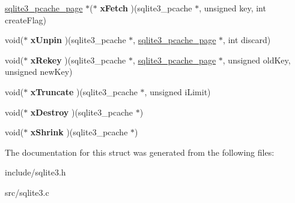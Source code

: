 \begin{DoxyCompactItemize}
\item 
\hypertarget{structsqlite3__pcache__methods2_ac74dd2b35193a4309494311995da2d25}{\hyperlink{structsqlite3__pcache__page}{sqlite3\-\_\-pcache\-\_\-page} $\ast$($\ast$ {\bfseries x\-Fetch} )(sqlite3\-\_\-pcache $\ast$, unsigned key, int create\-Flag)}\label{structsqlite3__pcache__methods2_ac74dd2b35193a4309494311995da2d25}

\item 
\hypertarget{structsqlite3__pcache__methods2_ac94294551eda282f17b1ed2a110e1850}{void($\ast$ {\bfseries x\-Unpin} )(sqlite3\-\_\-pcache $\ast$, \hyperlink{structsqlite3__pcache__page}{sqlite3\-\_\-pcache\-\_\-page} $\ast$, int discard)}\label{structsqlite3__pcache__methods2_ac94294551eda282f17b1ed2a110e1850}

\item 
\hypertarget{structsqlite3__pcache__methods2_a28a22927b108182e22025bbe6ba1f68e}{void($\ast$ {\bfseries x\-Rekey} )(sqlite3\-\_\-pcache $\ast$, \hyperlink{structsqlite3__pcache__page}{sqlite3\-\_\-pcache\-\_\-page} $\ast$, unsigned old\-Key, unsigned new\-Key)}\label{structsqlite3__pcache__methods2_a28a22927b108182e22025bbe6ba1f68e}

\item 
\hypertarget{structsqlite3__pcache__methods2_a7c565709ab91dbe7feb5b82c684ba604}{void($\ast$ {\bfseries x\-Truncate} )(sqlite3\-\_\-pcache $\ast$, unsigned i\-Limit)}\label{structsqlite3__pcache__methods2_a7c565709ab91dbe7feb5b82c684ba604}

\item 
\hypertarget{structsqlite3__pcache__methods2_a144d6e899889e80e00f93fb6c83359e2}{void($\ast$ {\bfseries x\-Destroy} )(sqlite3\-\_\-pcache $\ast$)}\label{structsqlite3__pcache__methods2_a144d6e899889e80e00f93fb6c83359e2}

\item 
\hypertarget{structsqlite3__pcache__methods2_af00c121e9c39b1df292711013c226ba5}{void($\ast$ {\bfseries x\-Shrink} )(sqlite3\-\_\-pcache $\ast$)}\label{structsqlite3__pcache__methods2_af00c121e9c39b1df292711013c226ba5}

\end{DoxyCompactItemize}


The documentation for this struct was generated from the following files\-:\begin{DoxyCompactItemize}
\item 
include/sqlite3.\-h\item 
src/sqlite3.\-c\end{DoxyCompactItemize}

